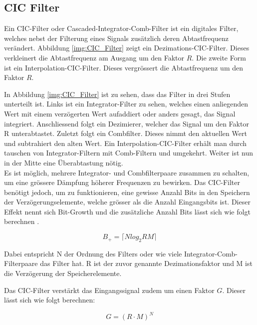 \subsection{CIC Filter}\label{subsec:CIC_Filter}

Ein CIC-Filter oder Cascaded-Integrator-Comb-Filter ist ein digitales Filter, welches nebst der Filterung eines Signals zusätzlich deren Abtastfrequenz verändert. Abbildung \ref{img:CIC_Filter} zeigt ein Dezimations-CIC-Filter. Dieses verkleinert die Abtastfrequenz am Ausgang um den Faktor \(R\). Die zweite Form ist ein Interpolation-CIC-Filter. Dieses vergrössert die Abtastfrequenz um den Faktor \(R\).

In Abbildung \ref{img:CIC_Filter} ist zu sehen, dass das Filter in drei Stufen unterteilt ist. Links ist ein Integrator-Filter zu sehen, welches einen anliegenden Wert mit einem verzögerten Wert aufaddiert oder anders gesagt, das Signal integriert. Anschliessend folgt ein Dezimierer, welcher das Signal um den Faktor R unterabtastet. Zuletzt folgt ein Combfilter. Dieses nimmt den aktuellen Wert und subtrahiert den alten Wert. Ein Interpolation-CIC-Filter erhält man durch tauschen von Integrator-Filtern mit Comb-Filtern und umgekehrt. Weiter ist nun in der Mitte eine Überabtastung nötig.\\
Es ist möglich, mehrere Integrator- und Combfilterpaare zusammen zu schalten, um eine grössere Dämpfung höherer Frequenzen zu bewirken. Das CIC-Filter benötigt jedoch, um zu funktionieren, eine gewisse Anzahl Bits in den Speichern der Verzögerungselemente, welche grösser als die Anzahl Eingangsbits ist. Dieser Effekt nennt sich Bit-Growth und die zusätzliche Anzahl Bits lässt sich wie folgt berechnen \cite{cic_a} \cite{cic_h}.

\begin{equation}
B_+ = \big \lceil Nlog_2RM \big \rceil
\label{equ:cic_bitgrowth}
\end{equation}

Dabei entspricht N der Ordnung des Filters oder wie viele Integrator-Comb-Filterpaare das Filter hat. R ist der zuvor genannte Dezimationsfaktor und M ist die Verzögerung der Speicherelemente.

Das CIC-Filter verstärkt das Eingangssignal zudem um einen Faktor \(G\). Dieser lässt sich wie folgt berechnen:

 \begin{equation}
 G = (R\cdot M)^N
 \label{equ:cic_gain}
 \end{equation}
 
